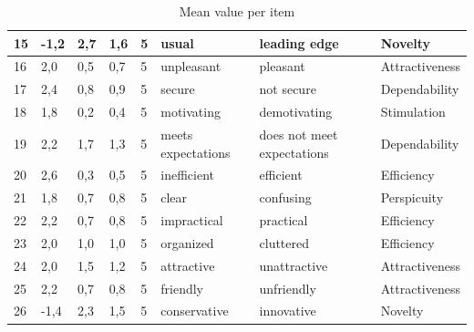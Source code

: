 \documentclass[conference,onecolumn]{IEEEtran}
\begin{document}
\begin{table}[H]
\begin{center}
\begin{tabular}[H]{ |m{1cm}|m{1cm}|m{1cm}|m{1cm}|m{1cm}|m{3cm}|m{3cm}|m{3cm}|}
                15	&-1,2	&2,7	&1,6	&5	&usual	                &leading edge	            &Novelty        \\ \hline
                16	&2,0	&0,5	&0,7	&5	&unpleasant	            &pleasant	                &Attractiveness     \\ \hline
                17	&2,4	&0,8	&0,9	&5	&secure	                &not secure	                &Dependability      \\ \hline
                18	&1,8	&0,2	&0,4	&5	&motivating	            &demotivating	            &Stimulation        \\ \hline
                19	&2,2	&1,7	&1,3	&5	&meets expectations     &does not meet expectations	&Dependability      \\ \hline
                20	&2,6	&0,3	&0,5	&5	&inefficient	        &efficient	                &Efficiency     \\ \hline
                21	&1,8	&0,7	&0,8	&5	&clear	                &confusing	                &Perspicuity        \\ \hline
                22	&2,2	&0,7	&0,8	&5	&impractical	        &practical	                &Efficiency     \\ \hline
                23	&2,0	&1,0	&1,0	&5	&organized	            &cluttered	                &Efficiency     \\ \hline
                24	&2,0	&1,5	&1,2	&5	&attractive	            &unattractive	            &Attractiveness     \\ \hline
                25	&2,2	&0,7	&0,8	&5	&friendly	            &unfriendly	                &Attractiveness     \\ \hline
                26	&-1,4	&2,3	&1,5	&5	&conservative	        &innovative	                &Novelty        \\ 
                \hline
            \end{tabular}
        \end{center}
        \caption{Mean value per item}
        \label{table:Mean value per item}
    \end{table}
\end{document}
